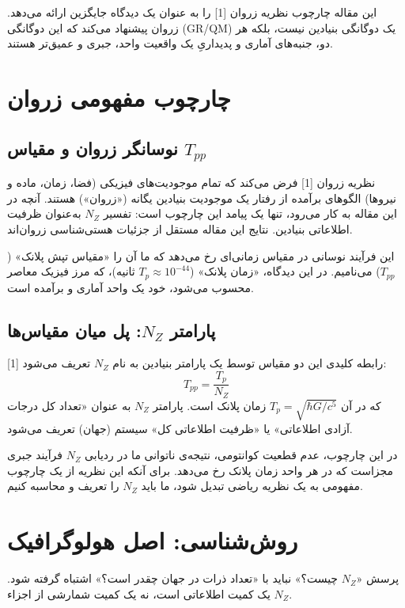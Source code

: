 \documentclass[11pt, a4paper, twocolumn]{article} %
\begin{document}
این مقاله چارچوب نظریه زروان [1] را به عنوان یک دیدگاه جایگزین ارائه می‌دهد. زروان پیشنهاد می‌کند که این دوگانگی (GR/QM) یک دوگانگی بنیادین نیست، بلکه هر دو، جنبه‌های آماری و پدیداریِ یک واقعیت واحد، جبری و عمیق‌تر هستند.

\section{چارچوب مفهومی زروان}

\subsection{نوسانگر زروان و مقیاس $T_{pp}$}

نظریه زروان [1] فرض می‌کند که تمام موجودیت‌های فیزیکی (فضا، زمان، ماده و نیروها) الگوهای برآمده از رفتار یک موجودیت بنیادین یگانه («زروان») هستند. آنچه در این مقاله به کار می‌رود، تنها یک پیامد این چارچوب است: تفسیر $N_Z$ به‌عنوان ظرفیت اطلاعاتی بنیادین. نتایج این مقاله مستقل از جزئیات هستی‌شناسی زروان‌اند.

این فرآیند نوسانی در مقیاس زمانی‌ای رخ می‌دهد که ما آن را «مقیاس تپش پلانک» ($T_{pp}$) می‌نامیم. در این دیدگاه، «زمان پلانک» ($T_p \approx 10^{-44}$ ثانیه)، که مرز فیزیک معاصر محسوب می‌شود، خود یک واحد آماری و برآمده است.

\subsection{\texorpdfstring{پارامتر $N_Z$: پل میان مقیاس‌ها}{پارامتر NZ: پل میان مقیاس‌ها}}

رابطه کلیدی این دو مقیاس توسط یک پارامتر بنیادین به نام $N_Z$ تعریف می‌شود [1]:
\begin{equation}
T_{pp} = \frac{T_p}{N_Z}
\end{equation}
که در آن $T_p = \sqrt{\hbar G / c^5}$ زمان پلانک است. پارامتر $N_Z$ به عنوان «تعداد کل درجات آزادی اطلاعاتی» یا «ظرفیت اطلاعاتی کل» سیستم (جهان) تعریف می‌شود.

در این چارچوب، عدم قطعیت کوانتومی، نتیجه‌ی ناتوانی ما در ردیابی $N_Z$ فرآیند جبری مجزاست که در هر واحد زمان پلانک رخ می‌دهد. برای آنکه این نظریه از یک چارچوب مفهومی به یک نظریه ریاضی تبدیل شود، ما باید $N_Z$ را تعریف و محاسبه کنیم.

\section{روش‌شناسی: اصل هولوگرافیک}

پرسش «$N_Z$ چیست؟» نباید با «تعداد ذرات در جهان چقدر است؟» اشتباه گرفته شود. $N_Z$ یک کمیت اطلاعاتی است، نه یک کمیت شمارشی از اجزاء.
\end{document}
